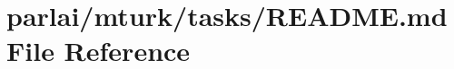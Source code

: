 \hypertarget{parlai_2mturk_2tasks_2README_8md}{}\section{parlai/mturk/tasks/\+R\+E\+A\+D\+ME.md File Reference}
\label{parlai_2mturk_2tasks_2README_8md}
